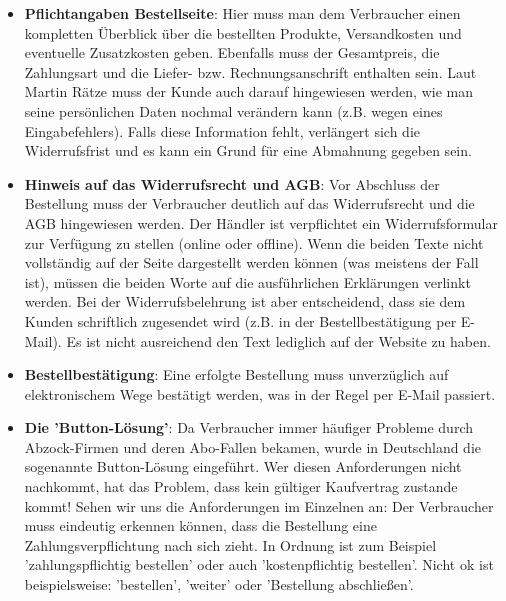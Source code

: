 \documentclass[a4paper]{article}
\begin{document}
\begin{itemize}
\item \textbf{Pflichtangaben Bestellseite}: Hier muss man dem Verbraucher einen kompletten Überblick über die bestellten Produkte, Versandkosten und eventuelle Zusatzkosten geben. Ebenfalls muss der Gesamtpreis, die Zahlungsart und die Liefer- bzw. Rechnungsanschrift enthalten sein. Laut Martin Rätze muss der Kunde auch darauf hingewiesen werden, wie man seine persönlichen Daten nochmal verändern kann (z.B. wegen eines Eingabefehlers). Falls diese Information fehlt, verlängert sich die Widerrufsfrist und es kann ein Grund für eine Abmahnung gegeben sein.
\item \textbf{Hinweis auf das Widerrufsrecht und AGB}: Vor Abschluss der Bestellung muss der Verbraucher deutlich auf das Widerrufsrecht und die AGB hingewiesen werden. Der Händler ist verpflichtet ein Widerrufsformular zur Verfügung zu stellen (online oder offline). Wenn die beiden Texte nicht vollständig auf der Seite dargestellt werden können (was meistens der Fall ist), müssen die beiden Worte auf die ausführlichen Erklärungen verlinkt werden. Bei der Widerrufsbelehrung ist aber entscheidend, dass sie dem Kunden schriftlich zugesendet wird (z.B. in der Bestellbestätigung per E-Mail). Es ist nicht ausreichend den Text lediglich auf der Website zu haben.

\item \textbf{Bestellbestätigung}: Eine erfolgte Bestellung muss unverzüglich auf elektronischem Wege bestätigt werden, was in der Regel per E-Mail passiert.

\item \textbf{Die 'Button-Lösung'}: Da Verbraucher immer häufiger Probleme durch Abzock-Firmen und deren Abo-Fallen bekamen, wurde in Deutschland die sogenannte Button-Lösung eingeführt. Wer diesen Anforderungen nicht nachkommt, hat das Problem, dass kein gültiger Kaufvertrag zustande kommt! Sehen wir uns die Anforderungen im Einzelnen an: Der Verbraucher muss eindeutig erkennen können, dass die Bestellung eine Zahlungsverpflichtung nach sich zieht. In Ordnung ist zum Beispiel 'zahlungspflichtig bestellen' oder auch 'kostenpflichtig bestellen'. Nicht ok ist beispielsweise: 'bestellen', 'weiter' oder 'Bestellung abschließen'.


\end{itemize}
\end{document}
